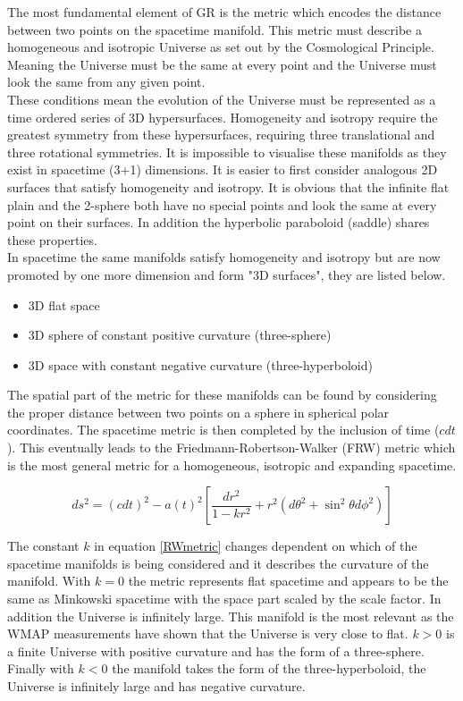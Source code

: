 \documentclass[12pt]{article} %
\begin{document}
The most fundamental element of GR is the metric which encodes the distance between two points on the spacetime manifold\cite{carlo}. This metric must describe a homogeneous and isotropic Universe as set out by the Cosmological Principle. Meaning the Universe must be the same at every point and the Universe must look the same from any given point\cite{carlo}. \\

These conditions mean the evolution of the Universe must be represented as a time ordered series of 3D hypersurfaces. Homogeneity and isotropy require the greatest symmetry from these hypersurfaces, requiring three translational and three rotational symmetries\cite{mukhanov}. It is impossible to visualise these manifolds as they exist in spacetime (3+1) dimensions. It is easier to first consider analogous 2D surfaces that satisfy homogeneity and isotropy. It is obvious that the infinite flat plain and the 2-sphere both have no special points and look the same at every point on their surfaces. In addition the hyperbolic paraboloid (saddle) shares these properties\cite{pritchard}.\\

In spacetime the same manifolds satisfy homogeneity and isotropy but are now promoted by one more dimension and form "3D surfaces", they are listed below.

\begin{itemize}
  \item 3D flat space
  \item 3D sphere of constant positive curvature (three-sphere)
  \item 3D space with constant negative curvature (three-hyperboloid)
\end{itemize} 

The spatial part of the metric for these manifolds can be found by considering the proper distance between two points on a sphere in spherical polar coordinates. The spacetime metric is then completed by the inclusion of time ($cdt$)\cite{cambridge}. This eventually leads to the Friedmann-Robertson-Walker (FRW) metric which is the most general metric for a homogeneous, isotropic and expanding spacetime.

\begin{equation}\label{RWmetric}
ds^2 = (cdt)^2 - a(t)^2 \left[ \frac{dr^2}{1-k r^2} + r^2(d\theta^2 + \sin^2 \theta d\phi ^2)\right]
\end{equation}

The constant $k$ in equation \ref{RWmetric} changes dependent on which of the spacetime manifolds is being considered and it describes the curvature of the manifold. With $k=0$ the metric represents flat spacetime and appears to be the same as Minkowski spacetime with the space part scaled by the scale factor. In addition the Universe is infinitely large. This manifold is the most relevant as the WMAP measurements have shown that the Universe is very close to flat. $k>0$ is a finite Universe with positive curvature and has the form of a three-sphere. Finally with $k<0$ the manifold takes the form of the three-hyperboloid, the Universe is infinitely large and has negative curvature.
\end{document}
